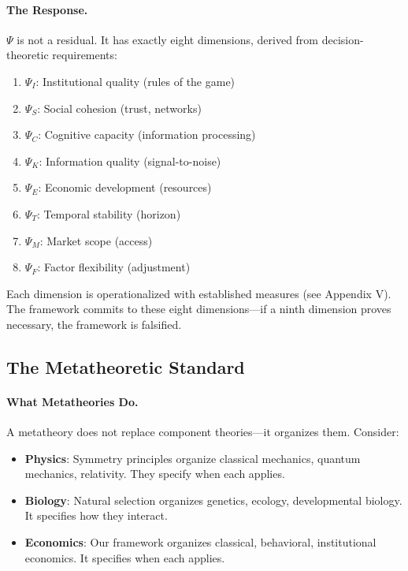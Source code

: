 \documentclass[12pt,a4paper]{article}
\begin{document}
\paragraph{The Response.}
$\Psi$ is not a residual. It has exactly eight dimensions, derived from decision-theoretic requirements:

\begin{enumerate}
    \item $\Psi_I$: Institutional quality (rules of the game)
    \item $\Psi_S$: Social cohesion (trust, networks)
    \item $\Psi_C$: Cognitive capacity (information processing)
    \item $\Psi_K$: Information quality (signal-to-noise)
    \item $\Psi_E$: Economic development (resources)
    \item $\Psi_T$: Temporal stability (horizon)
    \item $\Psi_M$: Market scope (access)
    \item $\Psi_F$: Factor flexibility (adjustment)
\end{enumerate}

Each dimension is operationalized with established measures (see Appendix V). The framework commits to these eight dimensions---if a ninth dimension proves necessary, the framework is falsified.

\subsection{The Metatheoretic Standard}

\paragraph{What Metatheories Do.}
A metatheory does not replace component theories---it organizes them. Consider:

\begin{itemize}
    \item \textbf{Physics}: Symmetry principles organize classical mechanics, quantum mechanics, relativity. They specify when each applies.
    \item \textbf{Biology}: Natural selection organizes genetics, ecology, developmental biology. It specifies how they interact.
    \item \textbf{Economics}: Our framework organizes classical, behavioral, institutional economics. It specifies when each applies.
\end{itemize}
\end{document}
